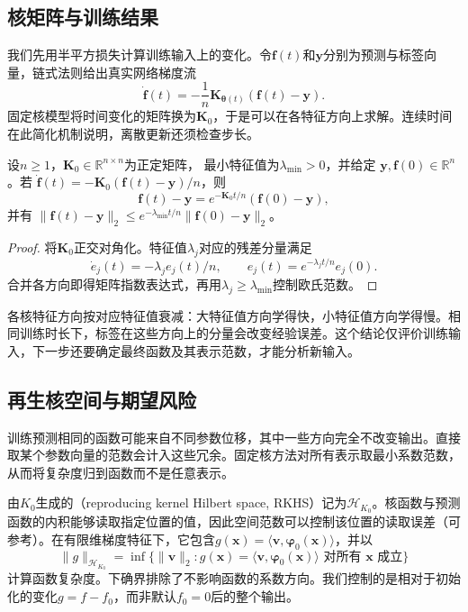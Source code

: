 \subsection{核矩阵与训练结果}

我们先用半平方损失计算训练输入上的变化。令$\bm f(t)$和$\bm y$分别为预测与标签向量，链式法则给出真实网络梯度流
\[
 \dot{\bm f}(t)=-\frac1n\bm K_{\bm\theta(t)}(\bm f(t)-\bm y).
\]
固定核模型将时间变化的矩阵换为$\bm K_0$，于是可以在各特征方向上求解。连续时间在此简化机制说明，离散更新还须检查步长。

\begin{theorem}[固定NTK下的训练收敛]
\label{thm:ntk-training-convergence}
设$n\geq1$，$\bm K_0\in\mathbb R^{n\times n}$为正定矩阵，
最小特征值为$\lambda_{\min}>0$，并给定
$\bm y,\bm f(0)\in\mathbb R^n$。若
$\dot{\bm f}(t)=-\bm K_0(\bm f(t)-\bm y)/n$，则
\[
 \bm f(t)-\bm y=e^{-\bm K_0t/n}(\bm f(0)-\bm y),
\]
并有
$\|\bm f(t)-\bm y\|_2\leq e^{-\lambda_{\min}t/n}\|\bm f(0)-\bm y\|_2$。
\end{theorem}
\begin{proof}
将$\bm K_0$正交对角化。特征值$\lambda_j$对应的残差分量满足
\[
 \dot e_j(t)=-\lambda_j e_j(t)/n,\qquad
 e_j(t)=e^{-\lambda_jt/n}e_j(0).
\]
合并各方向即得矩阵指数表达式，再用$\lambda_j\geq\lambda_{\min}$控制欧氏范数。
\end{proof}

各核特征方向按对应特征值衰减：大特征值方向学得快，小特征值方向学得慢。相同训练时长下，标签在这些方向上的分量会改变经验误差。这个结论仅评价训练输入，下一步还要确定最终函数及其表示范数，才能分析新输入。

\subsection{再生核空间与期望风险}
\label{sec:ntk-rkhs-generalization}

训练预测相同的函数可能来自不同参数位移，其中一些方向完全不改变输出。直接取某个参数向量的范数会计入这些冗余。固定核方法对所有表示取最小系数范数，从而将复杂度归到函数而不是任意表示。

由$K_0$生成的（reproducing kernel Hilbert space, RKHS）记为$\mathcal H_{K_0}$。核函数与预测函数的内积能够读取指定位置的值，因此空间范数可以控制该位置的读取误差（可参考）。在有限维梯度特征下，它包含$g(\bm x)=\langle\bm v,\bm\varphi_0(\bm x)\rangle$，并以
\[
 \|g\|_{\mathcal H_{K_0}}
 =\inf\{\|\bm v\|_2:g(\bm x)=\langle\bm v,\bm\varphi_0(\bm x)\rangle
                         \text{ 对所有 }\bm x\text{ 成立}\}
\]
计算函数复杂度。下确界排除了不影响函数的系数方向。我们控制的是相对于初始化的变化$g=f-f_0$，而非默认$f_0=0$后的整个输出。


